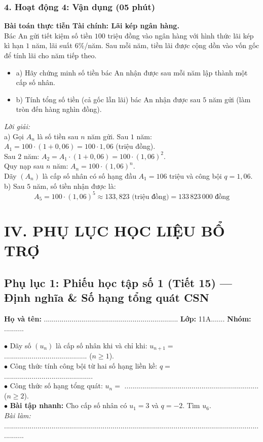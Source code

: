 \documentclass[12pt, a4paper]{article}
\begin{document}
\subsubsection*{4. Hoạt động 4: Vận dụng (05 phút)}
\textbf{Bài toán thực tiễn Tài chính: Lãi kép ngân hàng.}\\
Bác An gửi tiết kiệm số tiền $100$ triệu đồng vào ngân hàng với hình thức lãi kép kì hạn $1$ năm, lãi suất $6\%$/năm. Sau mỗi năm, tiền lãi được cộng dồn vào vốn gốc để tính lãi cho năm tiếp theo.
\begin{itemize}
    \item a) Hãy chứng minh số tiền bác An nhận được sau mỗi năm lập thành một cấp số nhân.
    \item b) Tính tổng số tiền (cả gốc lẫn lãi) bác An nhận được sau $5$ năm gửi (làm tròn đến hàng nghìn đồng).
\end{itemize}
\textit{Lời giải:}\\
a) Gọi $A_n$ là số tiền sau $n$ năm gửi.
Sau $1$ năm: $A_1 = 100 \cdot (1 + 0{,}06) = 100 \cdot 1{,}06$ (triệu đồng).\\
Sau $2$ năm: $A_2 = A_1 \cdot (1 + 0{,}06) = 100 \cdot (1{,}06)^2$.\\
Quy nạp sau $n$ năm: $A_n = 100 \cdot (1{,}06)^n$.\\
Dãy $(A_n)$ là cấp số nhân có số hạng đầu $A_1 = 106$ triệu và công bội $q = 1{,}06$.\\
b) Sau $5$ năm, số tiền nhận được là:
$$A_5 = 100 \cdot (1{,}06)^5 \approx 133{,}823\text{ (triệu đồng)} = 133\,823\,000\text{ đồng}$$


\newpage


\section*{IV. PHỤ LỤC HỌC LIỆU BỔ TRỢ}


\subsection*{Phụ lục 1: Phiếu học tập số 1 (Tiết 15) --- Định nghĩa \& Số hạng tổng quát CSN}
\noindent\textbf{Họ và tên:} .................................................................... \textbf{Lớp:} 11A....... \textbf{Nhóm:} ..........


\begin{pedabox}
    $\bullet$ Dãy số $(u_n)$ là cấp số nhân khi và chỉ khi: $u_{n+1} = $ .......................................... ($n \ge 1$).\\[0.3em]
    $\bullet$ Công thức tính công bội từ hai số hạng liền kề: $q = $ .............................................\\[0.3em]
    $\bullet$ Công thức số hạng tổng quát: $u_n = $ .................................................................... ($n \ge 2$).\\[0.3em]
    $\bullet$ \textbf{Bài tập nhanh:} Cho cấp số nhân có $u_1 = 3$ và $q = -2$. Tìm $u_6$.\\
    \textit{Bài làm:} ...........................................................................................................................................
\end{pedabox}
\end{document}

